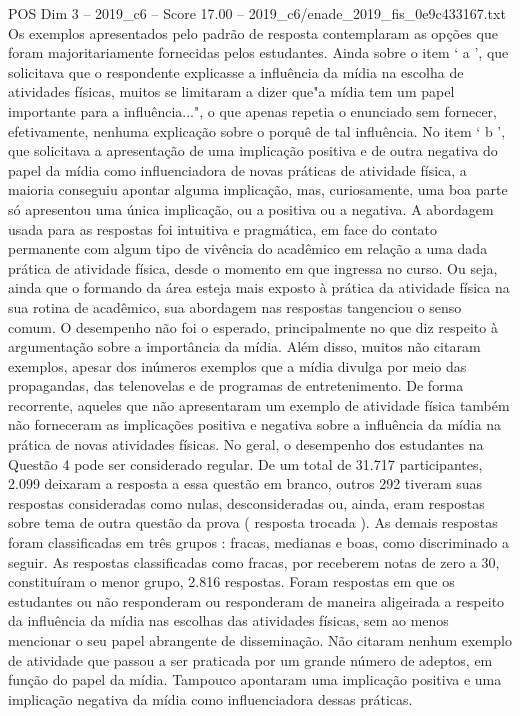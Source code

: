 \begin{textsample}{POS Dim 3 – 2019\_c6 – Score 17.00 – 2019\_c6/enade\_2019\_fis\_0e9c433167.txt}
Os exemplos apresentados pelo padrão de resposta contemplaram as opções que foram majoritariamente fornecidas pelos estudantes.
Ainda sobre o item ‘ a ’, que solicitava que o respondente explicasse a influência da mídia na escolha de atividades físicas, muitos se limitaram a dizer que"a mídia tem um papel importante para a influência...", o que apenas repetia o enunciado sem fornecer, efetivamente, nenhuma explicação sobre o porquê de tal influência.
No item ‘ b ’, que solicitava a apresentação de uma implicação positiva e de outra negativa do papel da mídia como influenciadora de novas práticas de atividade física, a maioria conseguiu apontar alguma implicação, mas, curiosamente, uma boa parte só apresentou uma única implicação, ou a positiva ou a negativa.
A abordagem usada para as respostas foi intuitiva e pragmática, em face do contato permanente com algum tipo de vivência do acadêmico em relação a uma dada prática de atividade física, desde o momento em que ingressa no curso.
Ou seja, ainda que o formando da área esteja mais exposto à prática da atividade física na sua rotina de acadêmico, sua abordagem nas respostas tangenciou o senso comum.
O desempenho não foi o esperado, principalmente no que diz respeito à argumentação sobre a importância da mídia.
Além disso, muitos não citaram exemplos, apesar dos inúmeros exemplos que a mídia divulga por meio das propagandas, das telenovelas e de programas de entretenimento.
De forma recorrente, aqueles que não apresentaram um exemplo de atividade física também não forneceram as implicações positiva e negativa sobre a influência da mídia na prática de novas atividades físicas.
No geral, o desempenho dos estudantes na Questão 4 pode ser considerado regular.
De um total de 31.717 participantes, 2.099 deixaram a resposta a essa questão em branco, outros 292 tiveram suas respostas consideradas como nulas, desconsideradas ou, ainda, eram respostas sobre tema de outra questão da prova ( resposta trocada ).
As demais respostas foram classificadas em três grupos : fracas, medianas e boas, como discriminado a seguir.
As respostas classificadas como fracas, por receberem notas de zero a 30, constituíram o menor grupo, 2.816 respostas.
Foram respostas em que os estudantes ou não responderam ou responderam de maneira aligeirada a respeito da influência da mídia nas escolhas das atividades físicas, sem ao menos mencionar o seu papel abrangente de disseminação.
Não citaram nenhum exemplo de atividade que passou a ser praticada por um grande número de adeptos, em função do papel da mídia.
Tampouco apontaram uma implicação positiva e uma implicação negativa da mídia como influenciadora dessas práticas.

\end{textsample}
